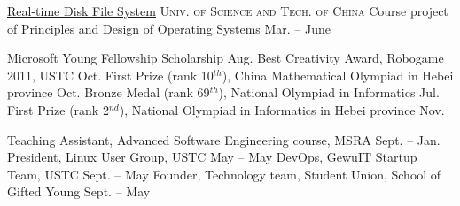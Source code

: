 \documentclass[10pt,a4paper]{article}
\begin{document}
\headedsection  %
{\href{https://git.ustclug.org/boj/rtfs}{Real-time Disk File System}}
{\textsc{Univ. of Science and Tech. of China}} {%
	\headedsubsection
	{Course project of Principles and Design of Operating Systems}
	{Mar.  -- June }
	{}
	}

\spacedhrule{0.5em}{-0.8em}


\headedsubsection
{Microsoft Young Fellowship Scholarship}
{Aug. }
{}
\headedsubsection
{Best Creativity Award, Robogame 2011, USTC}
{Oct. }
{}
\headedsubsection
{First Prize (rank 10$^{th}$), China Mathematical Olympiad in Hebei province}
{Oct. }
{}
\headedsubsection
{Bronze Medal (rank 69$^{th}$), National Olympiad in Informatics}
{Jul. }
{}
\headedsubsection
{First Prize (rank 2$^{nd}$), National Olympiad in Informatics in Hebei province}
{Nov. }
{}

\spacedhrule{0.5em}{-0.8em}


\headedsubsection
{Teaching Assistant, Advanced Software Engineering course, MSRA}
{Sept.  -- Jan. }
{}
\headedsubsection
{President, Linux User Group, USTC}
{May  -- May }
{}
\headedsubsection
{DevOps, GewuIT Startup Team, USTC}
{Sept.  -- May }
{}
\headedsubsection
{Founder, Technology team, Student Union, School of Gifted Young}
{Sept.  -- May }
{}

\spacedhrule{0.5em}{-0.8em}


\end{document}
